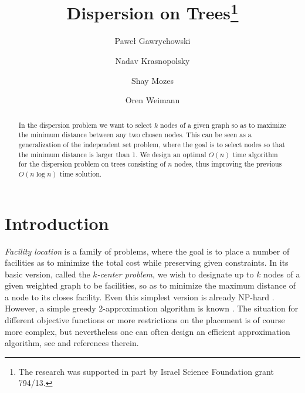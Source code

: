 \documentclass[11pt,a4paper]{article}
\newcommand{\Oh}{{O}}
\theoremstyle{definition}
\theoremstyle{remark}
\begin{document}
\title{Dispersion on Trees\thanks{The research was supported in part by Israel Science Foundation grant 794/13.}}
\author[1]{Pawe\l{} Gawrychowski}
\author[1]{Nadav Krasnopolsky}
\author[2]{Shay Mozes}
\author[1]{Oren Weimann}


\date{}
\maketitle

\begin{abstract}
In the dispersion problem we want to select $k$ nodes of a given graph so as to maximize
the minimum distance between any two chosen nodes. This can be seen as a generalization
of the independent set problem, where the goal is to select nodes so that the minimum distance
is larger than 1.
We design an optimal $\Oh(n)$ time algorithm for the dispersion problem on trees consisting
of $n$ nodes, thus improving the previous $\Oh(n\log n)$ time solution. 
%
\end{abstract}

\section{Introduction}
\emph{Facility location} is a family of problems, where the goal is to place a number of facilities as to minimize the total cost while preserving given constraints. In its basic version, called the \emph{$k$-center problem}, we wish to designate up to $k$ nodes of a given weighted graph to be facilities, so as to minimize the maximum distance of a node to its closes facility. Even this simplest version is already NP-hard \cite{Vazirani2003}. However, a simple greedy 2-approximation algorithm is known \cite{Gonzalez1985}. The situation for different objective functions or more restrictions on the placement is of course more complex, but nevertheless one can often design an efficient approximation algorithm, see \cite{DavidB.Shmoys1997} and  references therein.
\end{document}
